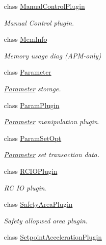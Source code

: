 \begin{DoxyCompactItemize}
class \mbox{\hyperlink{classmavros_1_1std__plugins_1_1ManualControlPlugin}{Manual\+Control\+Plugin}}
\begin{DoxyCompactList}\small\item\em Manual Control plugin. \end{DoxyCompactList}\item 
class \mbox{\hyperlink{classmavros_1_1std__plugins_1_1MemInfo}{Mem\+Info}}
\begin{DoxyCompactList}\small\item\em Memory usage diag (A\+P\+M-\/only) \end{DoxyCompactList}\item 
class \mbox{\hyperlink{classmavros_1_1std__plugins_1_1Parameter}{Parameter}}
\begin{DoxyCompactList}\small\item\em \mbox{\hyperlink{classmavros_1_1std__plugins_1_1Parameter}{Parameter}} storage. \end{DoxyCompactList}\item 
class \mbox{\hyperlink{classmavros_1_1std__plugins_1_1ParamPlugin}{Param\+Plugin}}
\begin{DoxyCompactList}\small\item\em \mbox{\hyperlink{classmavros_1_1std__plugins_1_1Parameter}{Parameter}} manipulation plugin. \end{DoxyCompactList}\item 
class \mbox{\hyperlink{classmavros_1_1std__plugins_1_1ParamSetOpt}{Param\+Set\+Opt}}
\begin{DoxyCompactList}\small\item\em \mbox{\hyperlink{classmavros_1_1std__plugins_1_1Parameter}{Parameter}} set transaction data. \end{DoxyCompactList}\item 
class \mbox{\hyperlink{classmavros_1_1std__plugins_1_1RCIOPlugin}{R\+C\+I\+O\+Plugin}}
\begin{DoxyCompactList}\small\item\em RC IO plugin. \end{DoxyCompactList}\item 
class \mbox{\hyperlink{classmavros_1_1std__plugins_1_1SafetyAreaPlugin}{Safety\+Area\+Plugin}}
\begin{DoxyCompactList}\small\item\em Safety allopwed area plugin. \end{DoxyCompactList}\item 
class \mbox{\hyperlink{classmavros_1_1std__plugins_1_1SetpointAccelerationPlugin}{Setpoint\+Acceleration\+Plugin}}

\end{DoxyCompactItemize}
